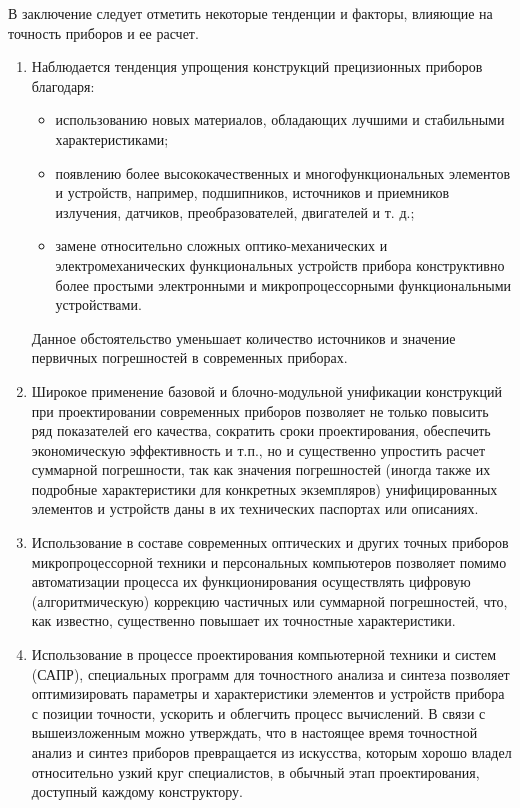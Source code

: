 В заключение следует отметить некоторые тенденции и факторы, влияющие на точность приборов и ее расчет.
\begin{enumerate}
\item Наблюдается тенденция упрощения конструкций прецизионных приборов благодаря:
\begin{itemize}
\item использованию новых материалов, обладающих лучшими и стабильными характеристиками;
\item появлению более высококачественных и многофункциональных элементов и устройств, например, подшипников, источников и приемников излучения, датчиков, преобразователей, двигателей и т. д.;
\item замене относительно сложных оптико-механических и электромеханических функциональных устройств прибора конструктивно более простыми электронными и микропроцессорными функциональными устройствами.
\end{itemize}
Данное обстоятельство уменьшает количество источников и значение первичных погрешностей в современных приборах.
\item Широкое применение базовой и блочно-модульной унификации конструкций при проектировании современных приборов позволяет не только повысить ряд показателей его качества, сократить сроки проектирования, обеспечить экономическую эффективность и т.п., но и существенно упростить расчет суммарной погрешности, так как значения погрешностей (иногда также их подробные характеристики для конкретных экземпляров) унифицированных элементов и устройств даны в их технических паспортах или описаниях.
\item Использование в составе современных оптических и других точных приборов микропроцессорной техники и персональных компьютеров позволяет помимо автоматизации процесса  их функционирования осуществлять цифровую (алгоритмическую) коррекцию частичных или суммарной погрешностей, что, как известно, существенно повышает их точностные характеристики.
\item Использование в процессе проектирования компьютерной техники и систем (САПР), специальных программ для точностного анализа и синтеза позволяет оптимизировать параметры и характеристики элементов и устройств прибора с позиции точности, ускорить и облегчить процесс вычислений.
В связи с вышеизложенным можно утверждать, что в настоящее время точностной анализ и синтез приборов превращается из искусства, которым хорошо владел относительно узкий круг специалистов, в обычный этап проектирования, доступный каждому конструктору.
\end{enumerate}

